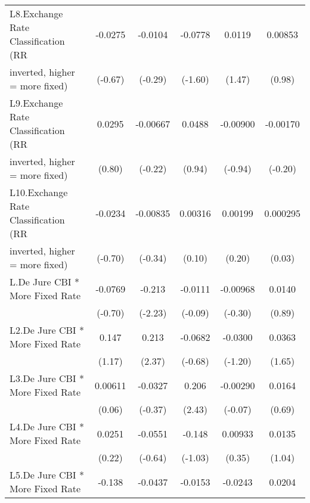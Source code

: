 {\begin{tabular}{l*{5}{c}}
L8.Exchange Rate Classification (RR     &  -0.0275         &  -0.0104         &  -0.0778         &   0.0119         &  0.00853         \\
inverted, higher = more fixed)          &  (-0.67)         &  (-0.29)         &  (-1.60)         &   (1.47)         &   (0.98)         \\
\addlinespace
L9.Exchange Rate Classification (RR     &   0.0295         & -0.00667         &   0.0488         & -0.00900         & -0.00170         \\
inverted, higher = more fixed)          &   (0.80)         &  (-0.22)         &   (0.94)         &  (-0.94)         &  (-0.20)         \\
\addlinespace
L10.Exchange Rate Classification (RR    &  -0.0234         & -0.00835         &  0.00316         &  0.00199         & 0.000295         \\
inverted, higher = more fixed)          &  (-0.70)         &  (-0.34)         &   (0.10)         &   (0.20)         &   (0.03)         \\
\addlinespace
L.De Jure CBI * More Fixed Rate         &  -0.0769         &   -0.213\sym{*}  &  -0.0111         & -0.00968         &   0.0140         \\
                                        &  (-0.70)         &  (-2.23)         &  (-0.09)         &  (-0.30)         &   (0.89)         \\
\addlinespace
L2.De Jure CBI * More Fixed Rate        &    0.147         &    0.213\sym{*}  &  -0.0682         &  -0.0300         &   0.0363         \\
                                        &   (1.17)         &   (2.37)         &  (-0.68)         &  (-1.20)         &   (1.65)         \\
\addlinespace
L3.De Jure CBI * More Fixed Rate        &  0.00611         &  -0.0327         &    0.206\sym{*}  & -0.00290         &   0.0164         \\
                                        &   (0.06)         &  (-0.37)         &   (2.43)         &  (-0.07)         &   (0.69)         \\
\addlinespace
L4.De Jure CBI * More Fixed Rate        &   0.0251         &  -0.0551         &   -0.148         &  0.00933         &   0.0135         \\
                                        &   (0.22)         &  (-0.64)         &  (-1.03)         &   (0.35)         &   (1.04)         \\
\addlinespace
L5.De Jure CBI * More Fixed Rate        &   -0.138         &  -0.0437         &  -0.0153         &  -0.0243         &   0.0204         \\

\end{tabular}}

